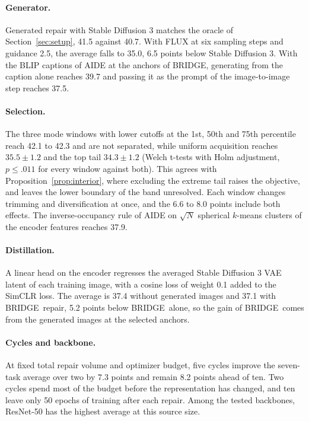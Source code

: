 \documentclass{article}
\newcommand{\method}{BRIDGE}
\begin{document}
\paragraph{Generator.} Generated repair with Stable Diffusion 3 matches the oracle of Section~\ref{sec:setup}, 41.5 against 40.7. With FLUX at six sampling steps and guidance 2.5, the average falls to 35.0, 6.5 points below Stable Diffusion 3. With the BLIP captions of AIDE at the anchors of \method, generating from the caption alone reaches 39.7 and passing it as the prompt of the image-to-image step reaches 37.5.

\paragraph{Selection.} The three mode windows with lower cutoffs at the 1st, 50th and 75th percentile reach 42.1 to 42.3 and are not separated, while uniform acquisition reaches $35.5\pm1.2$ and the top tail $34.3\pm1.2$ (Welch t-tests with Holm adjustment, $p\leq.011$ for every window against both). This agrees with Proposition~\ref{prop:interior}, where excluding the extreme tail raises the objective, and leaves the lower boundary of the band unresolved. Each window changes trimming and diversification at once, and the 6.6 to 8.0 points include both effects. The inverse-occupancy rule of AIDE on $\sqrt{N}$ spherical $k$-means clusters of the encoder features reaches 37.9.

\paragraph{Distillation.} A linear head on the encoder regresses the averaged Stable Diffusion 3 VAE latent of each training image, with a cosine loss of weight 0.1 added to the SimCLR loss. The average is 37.4 without generated images and 37.1 with \method\ repair, 5.2 points below \method\ alone, so the gain of \method\ comes from the generated images at the selected anchors.

\paragraph{Cycles and backbone.} At fixed total repair volume and optimizer budget, five cycles improve the seven-task average over two by 7.3 points and remain 8.2 points ahead of ten. Two cycles spend most of the budget before the representation has changed, and ten leave only 50 epochs of training after each repair. Among the tested backbones, ResNet-50 has the highest average at this source size.
\end{document}
